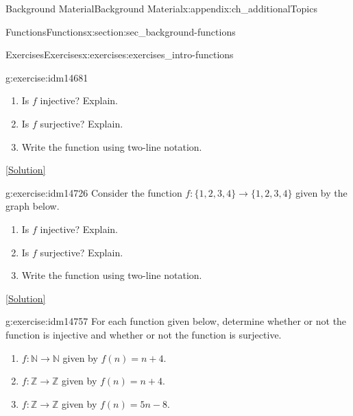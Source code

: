 \documentclass[oneside,10pt,]{book}
\numberwithin{equation}{chapter}
\def\N{\mathbb N}
\def\Z{\mathbb Z}
\begin{document}
\begin{appendixptx}{Background Material}{}{Background Material}{}{}{x:appendix:ch_additionalTopics}
\begin{sectionptx}{Functions}{}{Functions}{}{}{x:section:sec_background-functions}
\begin{exercises-subsection}{Exercises}{}{Exercises}{}{}{x:exercises:exercises_intro-functions}
\begin{divisionexercise}{3}{}{}{g:exercise:idm14681}
\par
%
\begin{enumerate}[label=(\alph*)]
\item{}Is \(f\) injective? Explain.%
\item{}Is \(f\) surjective? Explain.%
\item{}Write the function using two-line notation.%
\end{enumerate}
%
\space\hspace*{0pt}\hfill{\tiny\hyperlink{g:solution:idm14713-main}{[Solution]}}\end{divisionexercise}%
\begin{divisionexercise}{4}{}{}{g:exercise:idm14726}%
Consider the function \(f:\{1,2,3,4\} \to \{1,2,3,4\}\) given by the graph below.%
\begin{sidebyside}{1}{0.3}{0.3}{0}%
\begin{sbspanel}{0.4}%
%
\end{sbspanel}%
\end{sidebyside}%
\par
%
\begin{enumerate}[label=(\alph*)]
\item{}Is \(f\) injective? Explain.%
\item{}Is \(f\) surjective? Explain.%
\item{}Write the function using two-line notation.%
\end{enumerate}
%
\space\hspace*{0pt}\hfill{\tiny\hyperlink{g:solution:idm14743-main}{[Solution]}}\end{divisionexercise}%
\begin{divisionexercise}{5}{}{}{g:exercise:idm14757}%
For each function given below, determine whether or not the function is injective and whether or not the function is surjective.%
\begin{enumerate}[label=(\alph*)]
\item{}\(f:\N \to \N\) given by \(f(n) = n+4\).%
\item{}\(f:\Z \to \Z\) given by \(f(n) = n+4\).%
\item{}\(f:\Z \to \Z\) given by \(f(n) = 5n - 8\).%

\end{enumerate}
\end{divisionexercise}
\end{exercises-subsection}
\end{sectionptx}
\end{appendixptx}
\end{document}
